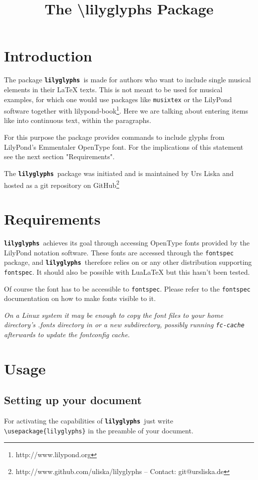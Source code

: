 \documentclass{article}
\title{The \textbackslash lilyglyphs Package}
\newcommand{\lilyglyphs}{\texttt{\textbf{lilyglyphs }}}
\newcommand*{\cmd}[1]{\texttt{\textbackslash #1}}
\begin{document}
\maketitle
\tableofcontents
\section{Introduction}
The package \lilyglyphs is made for authors who want to include single musical elements in their \LaTeX{} texts. This is not meant to be used for musical examples, for which one would use packages like \texttt{musixtex} or the LilyPond software together with lilypond-book\footnote{http://www.lilypond.org}. Here we are talking about entering items like \lilyRFZ* into continuous text, within the paragraphs.

For this purpose the package provides commands to include glyphs from LilyPond's Emmentaler OpenType font. For the implications of this statement see the next section "Requirements".

The \lilyglyphs package was initiated and is maintained by Urs Liska and hosted as a git repository on GitHub\footnote{http://www.github.com/uliska/lilyglyphs -- Contact: git@ursliska.de}

\section{Requirements}
\lilyglyphs achieves its goal through accessing OpenType fonts provided by the LilyPond notation software. These fonts are accessed through the \texttt{fontspec} package, and \lilyglyphs therefore relies on or any other distribution supporting \texttt{fontspec}. It should also be possible with LuaLaTeX but this hasn't been tested.

Of course the font has to be accessible to \texttt{fontspec}. Please refer to the \texttt{fontspec} documentation on how to make fonts visible to it. 

\textit{On a Linux system it may be enough to copy the font files to your home directory's .fonts directory in or a new subdirectory, possibly running \texttt{fc-cache} afterwards to update the fontconfig cache.}



\section{Usage}
\subsection{Setting up your document}
For activating the capabilities of \lilyglyphs just write \cmd{usepackage\{lilyglyphs\}} in the preamble of your document.
\end{document}
